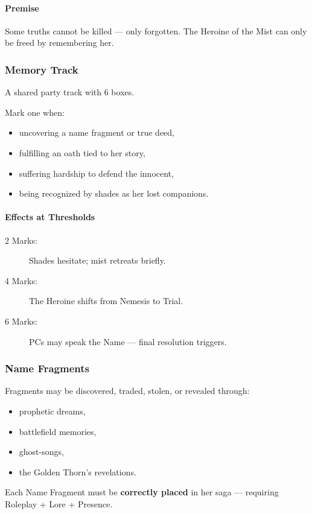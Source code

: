 \documentclass[11pt]{article}
\begin{document}
\paragraph*{Premise}
Some truths cannot be killed --- only forgotten.  
The Heroine of the Mist can only be freed by remembering her.

\subsubsection*{Memory Track}
A shared party track with 6 boxes.

Mark one when:
\begin{itemize}
    \item uncovering a name fragment or true deed,
    \item fulfilling an oath tied to her story,
    \item suffering hardship to defend the innocent,
    \item being recognized by shades as her lost companions.
\end{itemize}

\paragraph*{Effects at Thresholds}
\begin{description}
    \item[2 Marks:] Shades hesitate; mist retreats briefly.
    \item[4 Marks:] The Heroine shifts from Nemesis to Trial.
    \item[6 Marks:] PCs may speak the Name --- final resolution triggers.
\end{description}

\subsubsection*{Name Fragments}
Fragments may be discovered, traded, stolen, or revealed through:
\begin{itemize}
    \item prophetic dreams,
    \item battlefield memories,
    \item ghost-songs,
    \item the Golden Thorn's revelations.
\end{itemize}

Each Name Fragment must be \textbf{correctly placed} in her saga --- requiring Roleplay + Lore + Presence.
\end{document}
